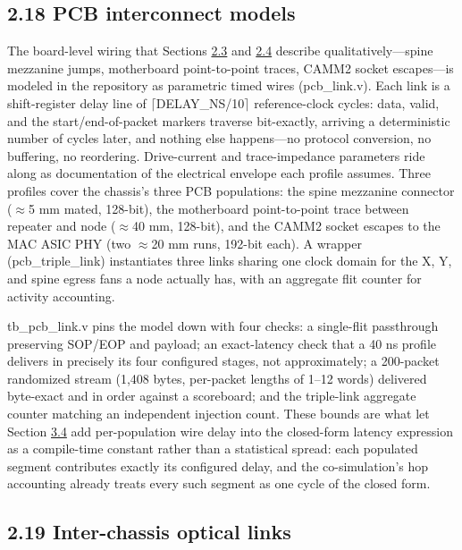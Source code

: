 \documentclass[10pt,twocolumn]{article}
\begin{document}
\subsection*{2.18 PCB interconnect models}\label{sec:2.18}

The board-level wiring that Sections \hyperref[sec:2.3]{2.3} and \hyperref[sec:2.4]{2.4} describe qualitatively---spine mezzanine jumps, motherboard point-to-point traces, CAMM2 socket escapes---is modeled in the repository as parametric timed wires (pcb\_link.v). Each link is a shift-register delay line of $\lceil$DELAY\_NS/10$\rceil$ reference-clock cycles: data, valid, and the start/end-of-packet markers traverse bit-exactly, arriving a deterministic number of cycles later, and nothing else happens---no protocol conversion, no buffering, no reordering. Drive-current and trace-impedance parameters ride along as documentation of the electrical envelope each profile assumes. Three profiles cover the chassis's three PCB populations: the spine mezzanine connector ($\approx$5 mm mated, 128-bit), the motherboard point-to-point trace between repeater and node ($\approx$40 mm, 128-bit), and the CAMM2 socket escapes to the MAC ASIC PHY (two $\approx$20 mm runs, 192-bit each). A wrapper (pcb\_triple\_link) instantiates three links sharing one clock domain for the X, Y, and spine egress fans a node actually has, with an aggregate flit counter for activity accounting.

tb\_pcb\_link.v pins the model down with four checks: a single-flit passthrough preserving SOP/EOP and payload; an exact-latency check that a 40 ns profile delivers in precisely its four configured stages, not approximately; a 200-packet randomized stream (1,408 bytes, per-packet lengths of 1--12 words) delivered byte-exact and in order against a scoreboard; and the triple-link aggregate counter matching an independent injection count. These bounds are what let Section \hyperref[sec:3.4]{3.4} add per-population wire delay into the closed-form latency expression as a compile-time constant rather than a statistical spread: each populated segment contributes exactly its configured delay, and the co-simulation's hop accounting already treats every such segment as one cycle of the closed form.

\subsection*{2.19 Inter-chassis optical links}\label{sec:2.19}
\end{document}
